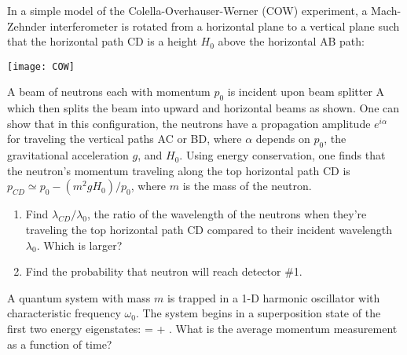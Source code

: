 \begin{exercise}
In a simple model of the Colella-Overhauser-Werner (COW) experiment, a Mach-Zehnder interferometer is rotated from a horizontal plane to a vertical plane such that the horizontal path CD is a height $H_{0}$ above the horizontal AB path:

{\centering\texttt{[image: COW]}}

A beam of neutrons each with momentum $p_{0}$ is incident upon beam splitter A which then splits the beam into upward and horizontal beams as shown.  One can show that in this configuration, the neutrons have a propagation amplitude $e^{i\alpha}$ for traveling the vertical paths AC or BD, where $\alpha$ depends on $p_{0}$, the gravitational acceleration $g$, and $H_{0}$.  Using energy conservation, one finds that the neutron's momentum traveling along the top horizontal path CD is $p_{CD} \simeq p_{0} - (m^{2}gH_{0})/p_{0}$, where $m$ is the mass of the neutron.


\begin{enumerate}
\item Find $\lambda_{CD}/\lambda_{0}$,  the ratio of the wavelength of the neutrons when they're traveling the top horizontal path CD compared to their incident wavelength $\lambda_{0}$.   Which is larger?

\item Find the probability that neutron will reach detector \#1.  
\end{enumerate}

\end{exercise}

\begin{exercise}
A quantum system with mass $m$ is trapped in a 1-D harmonic oscillator with characteristic frequency $\omega_0$. The system begins in a superposition state of the first two energy eigenstates:
\beq
{} =  + .
\eeq
What is the average momentum measurement as a function of time?
\end{exercise}

